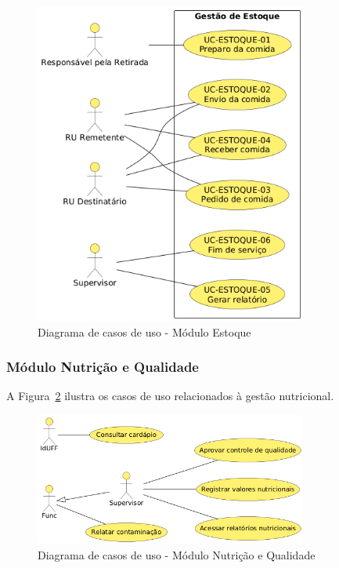 \documentclass[12pt,a4paper]{article}
\begin{document}
\begin{figure}[H]
    \centering
    \includegraphics[width=0.8\textwidth]{diagramas/diagrama-estoque.png}
    \caption{Diagrama de casos de uso - Módulo Estoque}
    \label{fig:diagrama_estoque}
\end{figure}

\subsubsection{Módulo Nutrição e Qualidade}
A Figura~\ref{fig:diagrama_nutricao} ilustra os casos de uso relacionados à gestão nutricional.

\begin{figure}[H]
    \centering
    \includegraphics[width=0.8\textwidth]{diagramas/diagrama-nutricao.png}
    \caption{Diagrama de casos de uso - Módulo Nutrição e Qualidade}
    \label{fig:diagrama_nutricao}
\end{figure}
\end{document}
